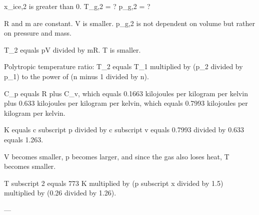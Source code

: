x_ice,2 is greater than 0.  
T_g,2 = ?  
p_g,2 = ?  

R and m are constant.  
V is smaller.  
p_g,2 is not dependent on volume but rather on pressure and mass.  

T_2 equals pV divided by mR.  
T is smaller.  

Polytropic temperature ratio:  
T_2 equals T_1 multiplied by (p_2 divided by p_1) to the power of (n minus 1 divided by n).  

C_p equals R plus C_v, which equals 0.1663 kilojoules per kilogram per kelvin plus 0.633 kilojoules per kilogram per kelvin, which equals 0.7993 kilojoules per kilogram per kelvin.

K equals c subscript p divided by c subscript v equals 0.7993 divided by 0.633 equals 1.263.  

V becomes smaller, p becomes larger, and since the gas also loses heat, T becomes smaller.  

T subscript 2 equals 773 K multiplied by (p subscript x divided by 1.5) multiplied by (0.26 divided by 1.26).  

---